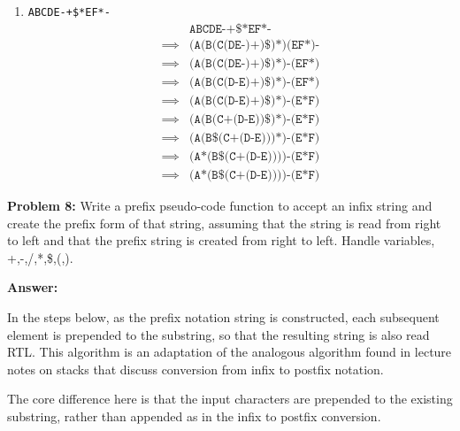 \documentclass[12pt,letterpaper,final]{report}
\begin{document}
\begin{enumerate}
  \item \texttt{ABCDE-+\$*EF*-}
        \begin{align*}
                   & \texttt{ABCDE-+\$*EF*-}                                     \\
          \implies & \texttt{(A(B(C(DE-)+)\$)*)(EF*)-}                           \\
          \implies & \boxed{\texttt{(A(B(C(DE-)+)\$)*)-(EF*)}}                   \\
          \implies & \texttt{(A(B(C(}\boxed{\texttt{D-E}}\texttt{)+)\$)*)-(EF*)} \\
          \implies & \texttt{(A(B(C(D-E)+)\$)*)-(}\boxed{\texttt{E*F}}\texttt{)} \\
          \implies & \texttt{(A(B(}\boxed{\texttt{C+(D-E)}}\texttt{)\$)*)-(E*F)} \\
          \implies & \texttt{(A(}\boxed{\texttt{B\$(C+(D-E))}}\texttt{)*)-(E*F)} \\
          \implies & \texttt{(}\boxed{\texttt{A*(B\$(C+(D-E)))}}\texttt{)-(E*F)} \\
          \implies & \texttt{(A*(B\$(C+(D-E))))-(E*F)}
        \end{align*}
\end{enumerate}


\noindent\textbf{Problem 8:}
Write a prefix pseudo-code function to accept an infix string and create the prefix form of that string, assuming that the string is read from right to left and that the prefix string is created from right to left. Handle variables, +,-,/,*,\$,(,).

\noindent\textbf{Answer:}


In the steps below, as the prefix notation string is constructed, each subsequent element is prepended to the substring, so that the resulting string is also read RTL. This algorithm is an adaptation of the analogous algorithm found in \cite{wse-hopkins-605-202-81-02B-Slides} lecture notes on stacks that discuss conversion from infix to postfix notation.

The core difference here is that the input characters are prepended to the existing substring, rather than appended as in the infix to postfix conversion.
\end{document}
